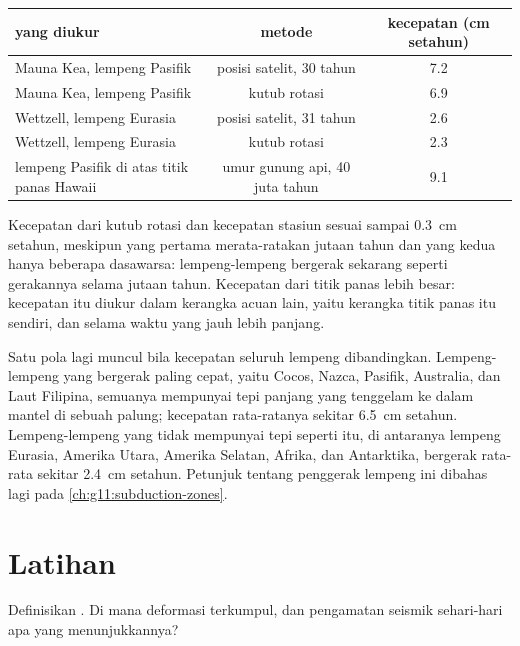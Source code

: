 \begin{center}
\small
\begin{tabular}{|l|c|c|}
\hline
yang diukur & metode & kecepatan (\unit{cm} setahun) \\ \hline
Mauna Kea, lempeng Pasifik & posisi satelit, 30 tahun & 7.2 \\
Mauna Kea, lempeng Pasifik & kutub rotasi & 6.9 \\
Wettzell, lempeng Eurasia & posisi satelit, 31 tahun & 2.6 \\
Wettzell, lempeng Eurasia & kutub rotasi & 2.3 \\
lempeng Pasifik di atas titik panas Hawaii & umur gunung api, 40 juta tahun & 9.1 \\ \hline
\end{tabular}
\end{center}

Kecepatan dari kutub rotasi dan kecepatan stasiun sesuai sampai
\qty{0.3}{cm} setahun, meskipun yang pertama merata-ratakan jutaan tahun dan
yang kedua hanya beberapa dasawarsa: lempeng-lempeng bergerak sekarang seperti
gerakannya selama jutaan tahun. Kecepatan dari titik panas lebih besar:
kecepatan itu diukur dalam kerangka acuan lain, yaitu kerangka titik panas itu
sendiri, dan selama waktu yang jauh lebih panjang.

Satu pola lagi muncul bila kecepatan seluruh lempeng dibandingkan. Lempeng-lempeng
yang bergerak paling cepat, yaitu Cocos, Nazca, Pasifik, Australia, dan Laut
Filipina, semuanya mempunyai tepi panjang yang tenggelam ke dalam mantel di
sebuah palung; kecepatan rata-ratanya sekitar \qty{6.5}{cm} setahun.
Lempeng-lempeng yang tidak mempunyai tepi seperti itu, di antaranya lempeng
Eurasia, Amerika Utara, Amerika Selatan, Afrika, dan Antarktika, bergerak
rata-rata sekitar \qty{2.4}{cm} setahun. Petunjuk tentang penggerak lempeng ini
dibahas lagi pada \cref{ch:g11:subduction-zones}.

\section{Latihan}

\begin{exercise}[$\star$]\label{exo:g11:plate-motions:1}
Definisikan . Di mana deformasi  terkumpul, dan pengamatan
seismik sehari-hari apa yang menunjukkannya?
\end{exercise}

